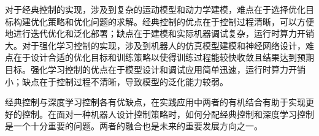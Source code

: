 
\begin{conclusion}

对于经典控制的实现，涉及到复杂的运动模型和动力学建模，难点在于选择优化目标构建优化策略和优化问题的求解。经典控制的优点在于控制过程清晰，可以方便地进行迭代优化和泛化部署；缺点在于建模和实际机器调试复杂，运行时算力开销大。对于强化学习控制的实现，涉及到机器人的仿真模型建模和神经网络设计，难点在于设计合适的优化目标和训练策略以使得训练过程能较快收敛且结果达到预期目标。强化学习控制的优点在于模型设计和调试应用简单迅速，运行时算力开销小；缺点在于控制过程不清晰，导致模型的泛化能力较弱。

经典控制与深度学习控制各有优缺点，在实践应用中两者的有机结合有助于实现更好的控制。在面对一种机器人设计控制策略时，如何分配经典控制和深度学习控制是一个十分重要的问题。两者的融合也是未来的重要发展方向之一。


\end{conclusion}
